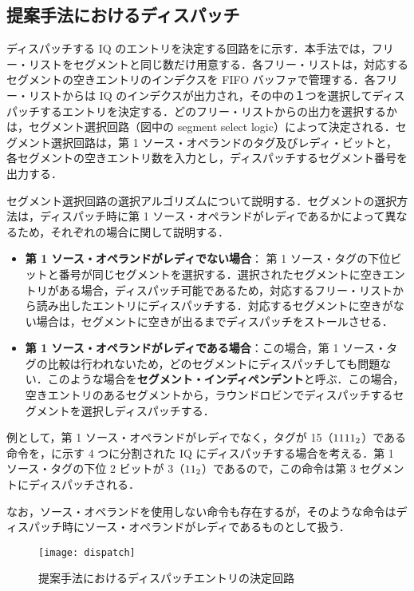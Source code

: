 \subsection{提案手法におけるディスパッチ}
ディスパッチする IQ のエントリを決定する回路をに示す．本手法では，フリー・リストをセグメントと同じ数だけ用意する．各フリー・リストは，対応するセグメントの空きエントリのインデクスを FIFO バッファで管理する．各フリー・リストからは IQ のインデクスが出力され，その中の１つを選択してディスパッチするエントリを決定する．どのフリー・リストからの出力を選択するかは，セグメント選択回路（図中の segment select logic）によって決定される．セグメント選択回路は，第 1 ソース・オペランドのタグ及びレディ・ビットと，各セグメントの空きエントリ数を入力とし，ディスパッチするセグメント番号を出力する．

セグメント選択回路の選択アルゴリズムについて説明する．セグメントの選択方法は，ディスパッチ時に第 1 ソース・オペランドがレディであるかによって異なるため，それぞれの場合に関して説明する．
\begin{itemize}
  \item \textbf{第 1 ソース・オペランドがレディでない場合}： 第 1 ソース・タグの下位ビットと番号が同じセグメントを選択する．選択されたセグメントに空きエントリがある場合，ディスパッチ可能であるため，対応するフリー・リストから読み出したエントリにディスパッチする．対応するセグメントに空きがない場合は，セグメントに空きが出るまでディスパッチをストールさせる．
  \item \textbf{第 1 ソース・オペランドがレディである場合}：この場合，第 1 ソース・タグの比較は行われないため，どのセグメントにディスパッチしても問題ない．このような場合を\textbf{セグメント・インディペンデント}と呼ぶ．この場合，空きエントリのあるセグメントから，ラウンドロビンでディスパッチするセグメントを選択しディスパッチする．
\end{itemize}
例として，第 1 ソース・オペランドがレディでなく，タグが 15（${\rm 1111_2}$）である命令を，に示す 4 つに分割された IQ にディスパッチする場合を考える．第 1 ソース・タグの下位 2 ビットが 3（${\rm 11_2}$）であるので，この命令は第 3 セグメントにディスパッチされる．　

なお，ソース・オペランドを使用しない命令も存在するが，そのような命令はディスパッチ時にソース・オペランドがレディであるものとして扱う．

\begin{figure}[htb]
  \centering
  \texttt{[image: dispatch]}
  \caption{提案手法におけるディスパッチエントリの決定回路}
  \label{fig:dispatch}
\end{figure}

